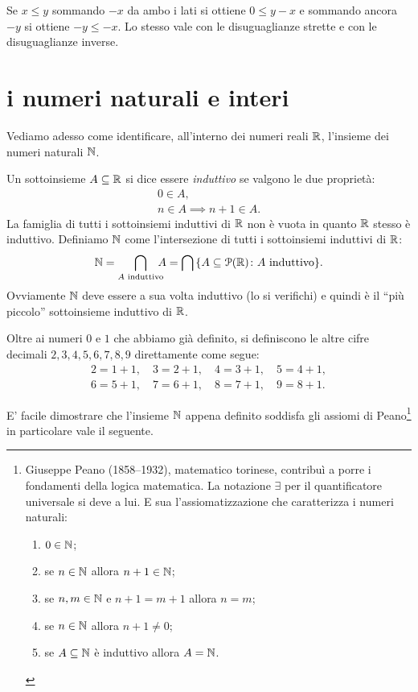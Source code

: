 Se $x\le y$ sommando $-x$ da ambo i lati si ottiene 
$0 \le y-x$ e sommando ancora $-y$ si ottiene 
$-y \le -x$. Lo stesso vale con le disuguaglianze strette
e con le disuguaglianze inverse.
  
\section{i numeri naturali e interi}

Vediamo adesso come identificare, all'interno dei numeri reali $\mathbb R$,
l'insieme dei numeri naturali $\NN$.

\begin{definition}
  \label{def:naturali}%
  Un sottoinsieme $A\subseteq \mathbb R$ si dice essere \emph{induttivo}
  se valgono le due proprietà:
  \begin{gather*}
    0 \in A, \\
    n\in A \implies n+1 \in A.
  \end{gather*}
  La famiglia di tutti i sottoinsiemi induttivi di $\mathbb R$ non è vuota
  in quanto $\mathbb R$ stesso è induttivo. Definiamo $\NN$ come l'intersezione
  di tutti i sottoinsiemi induttivi di $\mathbb R$:
  \[
     \mathbb N 
     = \bigcap_{A\text{ induttivo}} \!\!\!\!A 
     = \bigcap{\left\{ A\subseteq\mathcal P(\mathbb R)\colon A \text{ induttivo} \right\}}.
  \]
  Ovviamente $\NN$ deve essere a sua volta induttivo (lo si verifichi) 
  e quindi è il ``più piccolo'' sottoinsieme induttivo di $\mathbb R$.
  \mymargin{$\NN$}
\end{definition}

Oltre ai numeri $0$ e $1$ che abbiamo già definito, si definiscono 
le altre cifre decimali $2,3,4,5,6,7,8,9$ direttamente come segue:
\begin{gather*}
 2 = 1+1,\quad
 3 = 2+1,\quad 
 4 = 3+1,\quad
 5 = 4+1,\\ 
 6 = 5+1,\quad
 7 = 6+1,\quad
 8 = 7+1,\quad
 9 = 8+1.
\end{gather*}

E' facile dimostrare che l'insieme $\NN$ appena definito
soddisfa gli assiomi di Peano\footnote{%
Giuseppe Peano (1858--1932), matematico torinese, contribuì a porre 
i fondamenti della logica matematica. 
La notazione $\exists$ per il quantificatore universale si deve a lui.
E sua l'assiomatizzazione che caratterizza i numeri naturali:
\begin{enumerate}
  \item $0\in \mathbb N$;
  \item se $n\in \mathbb N$ allora $n+1\in \mathbb N$;
  \item se $n,m\in\mathbb N$ e $n+1=m+1$ allora $n=m$;
  \item se $n\in \mathbb N$ allora $n+1\neq 0$;
  \item se $A\subseteq \mathbb N$ è induttivo allora $A=\mathbb N$.
\end{enumerate}
}
in particolare vale il seguente. 

